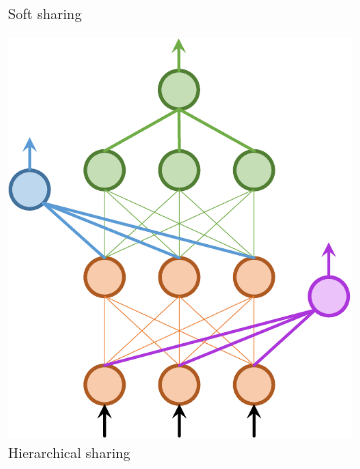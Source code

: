 \documentclass[letterpaper]{article} %
\begin{document}
\begin{figure}[htb]
\begin{subfigure}{0.45\linewidth}
        \caption{Soft sharing}
        \label{sfig:soft-sharing}
        \end{subfigure}\hfill
    \quad
    \begin{subfigure}{0.45\linewidth}
        \centering
        \includegraphics[scale=.36]{3353_hier_sharing.pdf}
        \caption{Hierarchical sharing}
        \label{sfig:hier-sharing}
        \end{subfigure}\hfill
    \begin{subfigure}{0.45\linewidth}
        \centering

\end{subfigure}
\end{figure}
\end{document}
